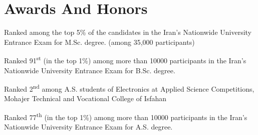 \section{Awards And Honors}

{Ranked among the top 5\% of the candidates in the Iran's Nationwide University Entrance Exam for M.Sc. degree. (among 35,000 participants)}

{Ranked 91\textsuperscript{st} (in the top 1\%) among more than 10000 participants in the Iran's Nationwide University Entrance Exam for B.Sc. degree.}

{Ranked 2\textsuperscript{nd} among A.S. students of Electronics at Applied Science Competitions, Mohajer Technical and Vocational College of Isfahan}

{Ranked 77\textsuperscript{th} (in the top 1\%) among more than 10000 participants in the Iran's Nationwide University Entrance Exam for A.S. degree.}